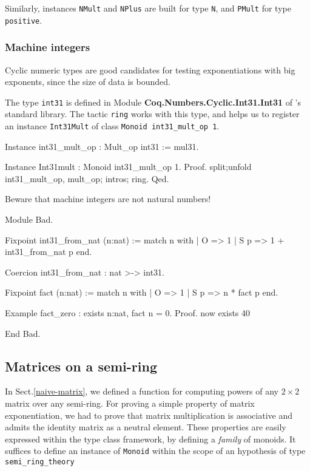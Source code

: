 Similarly, instances \texttt{NMult} and  \texttt{NPlus}  are built for type \texttt{N}, and
\texttt{PMult} for type \texttt{positive}.

\subsubsection{Machine integers}

Cyclic numeric types are  good candidates for testing exponentiations
with big exponents, since the size of data is bounded.

The type \texttt{int31} is defined  in Module
\textbf{Coq.Numbers.Cyclic.Int31.Int31} of \coq's standard library. The tactic \texttt{ring} works 
with this type, and helps us to register an instance \texttt{Int31Mult} of class  \texttt{Monoid int31\_mult\_op 1}.

\begin{Coqsrc}
Instance int31_mult_op : Mult_op int31 := mul31.

Instance  Int31mult : Monoid int31_mult_op  1.
Proof.
   split;unfold int31_mult_op, mult_op; intros; ring.
Qed.
\end{Coqsrc}

Beware that machine integers are not natural numbers! 

\begin{Coqbad}
Module Bad.

Fixpoint int31_from_nat (n:nat) :=
  match n with
  | O => 1
  | S p => 1 + int31_from_nat p
  end.

Coercion int31_from_nat : nat >-> int31.

Fixpoint fact (n:nat) := 
  match n with
   | O => 1
   | S p => n * fact p
  end.

Example fact_zero : exists n:nat, fact n = 0.
Proof.  now exists 40%

End Bad.
\end{Coqbad}

\subsection{Matrices on a semi-ring}

In Sect.\vref{naive-matrix}, we defined a function for computing powers of any $2\times 2$ 
matrix over any semi-ring. For proving a simple property of matrix exponentiation, we had
 to prove that matrix multiplication is associative and admits the identity matrix as a neutral element. These properties are easily expressed within the type class framework, by defining a \emph{family} of monoids.
It suffices to define an instance of \texttt{Monoid} within the scope of an hypothesis
of type \texttt{semi\_ring\_theory}


